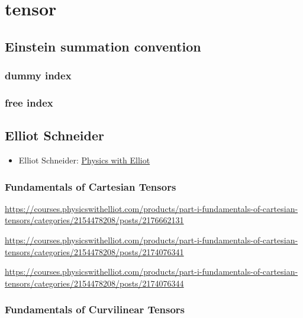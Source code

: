 \documentclass[
]{book}
\providecommand{\tightlist}{%
  \setlength{\itemsep}{0pt}\setlength{\parskip}{0pt}}
\theoremstyle{definition}
\theoremstyle{definition}
\theoremstyle{definition}
\theoremstyle{definition}
\theoremstyle{remark}
\begin{document}
\chapter{tensor}\label{tensor}

\section{Einstein summation convention}\label{einstein-summation-convention}

\subsection{dummy index}\label{dummy-index}

\subsection{free index}\label{free-index}

\section{Elliot Schneider}\label{elliot-schneider}

\begin{itemize}
\tightlist
\item
  Elliot Schneider: \href{https://www.youtube.com/@PhysicswithElliot/playlists}{Physics with Elliot}
\end{itemize}

\subsection{Fundamentals of Cartesian Tensors}\label{fundamentals-of-cartesian-tensors}

\url{https://courses.physicswithelliot.com/products/part-i-fundamentals-of-cartesian-tensors/categories/2154478208/posts/2176662131}

\url{https://courses.physicswithelliot.com/products/part-i-fundamentals-of-cartesian-tensors/categories/2154478208/posts/2174076341}

\url{https://courses.physicswithelliot.com/products/part-i-fundamentals-of-cartesian-tensors/categories/2154478208/posts/2174076344}

\subsection{Fundamentals of Curvilinear Tensors}\label{fundamentals-of-curvilinear-tensors}
\end{document}
